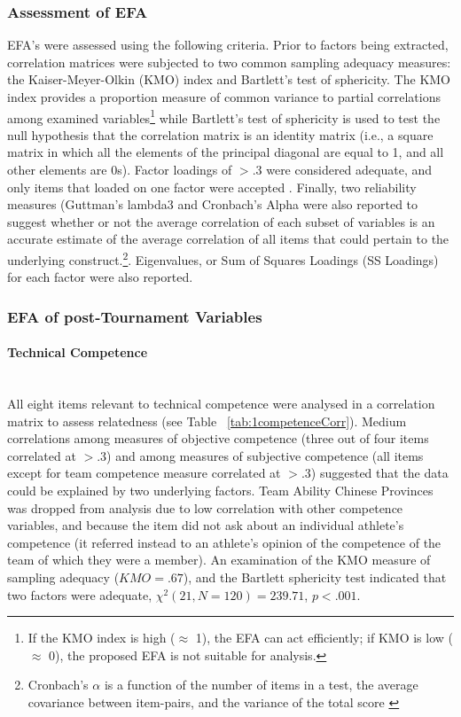 \documentclass[12pt]{report}
\newcommand{\myparagraph}[1]{\paragraph{#1}\mbox{}\\}
\begin{document}
{\subsubsection{Assessment of EFA}
EFA’s were assessed using the following criteria. Prior to factors being extracted, correlation matrices were subjected to two common sampling adequacy measures: the Kaiser-Meyer-Olkin (KMO) index and Bartlett’s test of sphericity. The KMO index provides a proportion measure of common variance to partial correlations among examined variables\footnote{If the KMO index is high ($\approx$ 1), the EFA can act efficiently; if KMO is low ($\approx$ 0), the proposed EFA is not suitable for analysis.} while Bartlett’s test of sphericity is used to test the null hypothesis that the correlation matrix is an identity matrix (i.e., a square matrix in which all the elements of the principal diagonal are equal to 1, and all other elements are 0s). Factor loadings of $> .3$ were considered adequate, and only items that loaded on one factor were accepted \citep{Field2012}. Finally, two reliability measures (Guttman's lambda3 and Cronbach's Alpha were also reported to suggest whether or not the average correlation of each subset of variables is an accurate estimate of the average correlation of all items that could pertain to the underlying construct.\footnote{Cronbach's $\alpha$ is a function of the number of items in a test, the average covariance between item-pairs, and the variance of the total score \citep{Tabachnick2007}}. Eigenvalues, or Sum of Squares Loadings (SS Loadings) for each factor were also reported\citep{Dziuban1974}.





\subsubsection{EFA of post-Tournament Variables}

\myparagraph{Technical Competence}
All eight items relevant to technical competence were analysed in a correlation matrix to assess relatedness (see Table ~\ref{tab:1competenceCorr}). Medium correlations among measures of objective competence (three out of four items correlated at $> .3$) and among measures of subjective competence (all items except for team competence measure correlated at $> .3$) suggested that the data could be explained by two underlying factors. Team Ability Chinese Provinces was dropped from analysis due to low correlation with other competence variables, and because the item did not ask about an individual athlete’s competence (it referred instead to an athlete’s opinion of the competence of the team of which they were a member). An examination of the KMO measure of sampling adequacy ($KMO = .67$), and the Bartlett sphericity test indicated that two factors were adequate, $\chi^2(21, N = 120) = 239.71$, $p < .001$. \\


}
\end{document}
